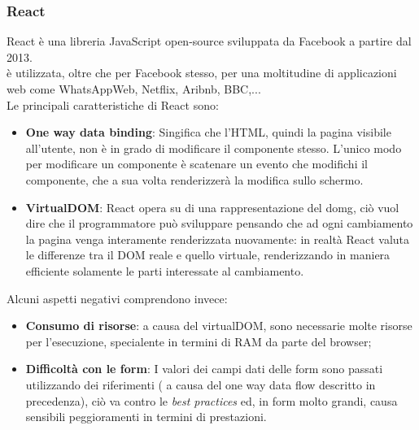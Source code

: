 \subsubsection{React}
React è una libreria JavaScript open-source sviluppata da Facebook a partire dal 2013.\\
è utilizzata, oltre che per Facebook stesso, per una moltitudine di applicazioni web come WhatsAppWeb, Netflix, Aribnb, BBC,...\\
Le principali caratteristiche di React sono:
\begin{itemize}
	\item \textbf{One way data binding}: Singifica che l'HTML, quindi la pagina visibile all'utente, non è in grado di modificare il componente stesso. L'unico modo per modificare un componente è scatenare un evento che modifichi il componente, che a sua volta renderizzerà la modifica sullo schermo.
	\item \textbf{VirtualDOM}: React opera su di una rappresentazione del \gls{domg}, ciò vuol dire che il programmatore può sviluppare pensando che ad ogni cambiamento la pagina venga interamente renderizzata nuovamente: in realtà React valuta le differenze tra il DOM reale e quello virtuale, renderizzando in maniera efficiente solamente le parti interessate al cambiamento.
\end{itemize}
Alcuni aspetti negativi comprendono invece:
\begin{itemize}
	\item \textbf{Consumo di risorse}: a causa del virtualDOM, sono necessarie molte risorse per l'esecuzione, specialente in termini di RAM da parte del browser;
	\item \textbf{Difficoltà con le form}: I valori dei campi dati delle form sono passati utilizzando dei riferimenti ( a causa del one way data flow descritto in precedenza), ciò va contro le \emph{best practices} ed, in form molto grandi, causa sensibili peggioramenti in termini di prestazioni.
\end{itemize}
